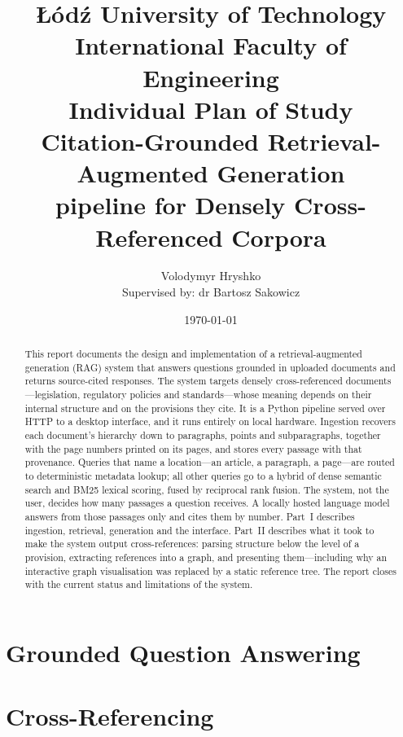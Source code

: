\documentclass[a4paper,11pt]{article}
\title{\textbf{Łódź University of Technology}\\
\textbf{International Faculty of Engineering}\\[0.5em]
\textbf{Individual Plan of Study}\\
\textbf{Citation-Grounded Retrieval-Augmented Generation}\\
\textbf{pipeline for Densely Cross-Referenced Corpora}}
\author{Volodymyr Hryshko \\
\small Supervised by: dr Bartosz Sakowicz}
\date{\today}
\begin{document}
\maketitle

\begin{abstract}
This report documents the design and implementation of a
retrieval-augmented generation (RAG) system that answers questions grounded
in uploaded documents and returns source-cited responses. The system targets
densely cross-referenced documents---legislation, regulatory policies and
standards---whose meaning depends on their internal structure and on the
provisions they cite. It is a Python pipeline served over HTTP to a desktop
interface, and it runs entirely on local hardware.
Ingestion recovers each document's hierarchy down to paragraphs, points and
subparagraphs, together with the page numbers printed on its pages, and stores
every passage with that provenance. Queries that name a location---an article,
a paragraph, a page---are routed to deterministic metadata lookup; all other
queries go to a hybrid of dense semantic search and BM25 lexical scoring,
fused by reciprocal rank fusion. The system, not the user, decides how many
passages a question receives. A locally hosted language model answers from
those passages only and cites them by number.
Part~I describes ingestion, retrieval, generation and the interface. Part~II
describes what it took to make the system output cross-references: parsing
structure below the level of a provision, extracting references into a graph,
and presenting them---including why an interactive graph visualisation was
replaced by a static reference tree. The report closes with the current status
and limitations of the system.
\end{abstract}

\clearpage
\tableofcontents
\newpage



\clearpage
\part{Grounded Question Answering}
\suppressfloats[t]





\clearpage
\part{Cross-Referencing}
\suppressfloats[t]


\end{document}
